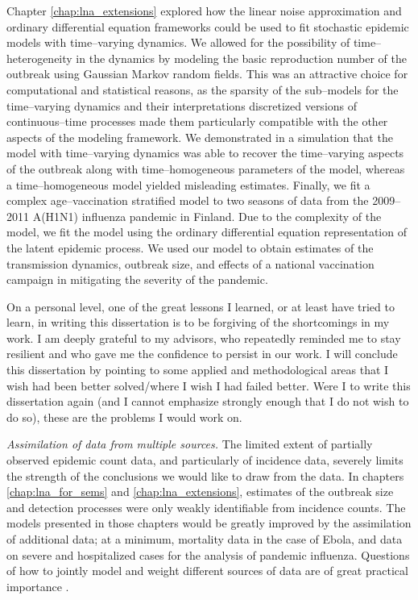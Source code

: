 Chapter \ref{chap:lna_extensions} explored how the linear noise approximation and ordinary differential equation frameworks could be used to fit stochastic epidemic models with time--varying dynamics. We allowed for the possibility of time--heterogeneity in the dynamics by modeling the basic reproduction number of the outbreak using Gaussian Markov random fields. This was an attractive choice for computational and statistical reasons, as the sparsity of the sub--models for the time--varying dynamics and their interpretations discretized versions of continuous--time processes made them particularly compatible with the other aspects of the modeling framework. We demonstrated in a simulation that the model with time--varying dynamics was able to recover the time--varying aspects of the outbreak along with time--homogeneous parameters of the model, whereas a time--homogeneous model yielded misleading estimates. Finally, we fit a complex age--vaccination stratified model to two seasons of data from the 2009--2011 A(H1N1) influenza pandemic in Finland. Due to the complexity of the model, we fit the model using the ordinary differential equation representation of the latent epidemic process. We used our model to obtain estimates of the transmission dynamics, outbreak size, and effects of a national vaccination campaign in mitigating the severity of the pandemic. 

On a personal level, one of the great lessons I learned, or at least have tried to learn, in writing this dissertation is to be forgiving of the shortcomings in my work. I am deeply grateful to my advisors, who repeatedly reminded me to stay resilient and who gave me the confidence to persist in our work. I will conclude this dissertation by pointing to some applied and methodological areas that I wish had been better solved/where I wish I had failed better. Were I to write this dissertation again (and I cannot emphasize strongly enough that I do not wish to do so), these are the problems I would work on. 

\textit{Assimilation of data from multiple sources.}
The limited extent of partially observed epidemic count data, and particularly of incidence data, severely limits the strength of the conclusions we would like to draw from the data. In chapters \ref{chap:lna_for_sems} and \ref{chap:lna_extensions}, estimates of the outbreak size and detection processes were only weakly identifiable from incidence counts. The models presented in those chapters would be greatly improved by the assimilation of additional data; at a minimum, mortality data in the case of Ebola, and data on severe and hospitalized cases for the analysis of pandemic influenza. Questions of how to jointly model and weight different sources of data are of great practical importance \cite{deangelis2015four}. 

